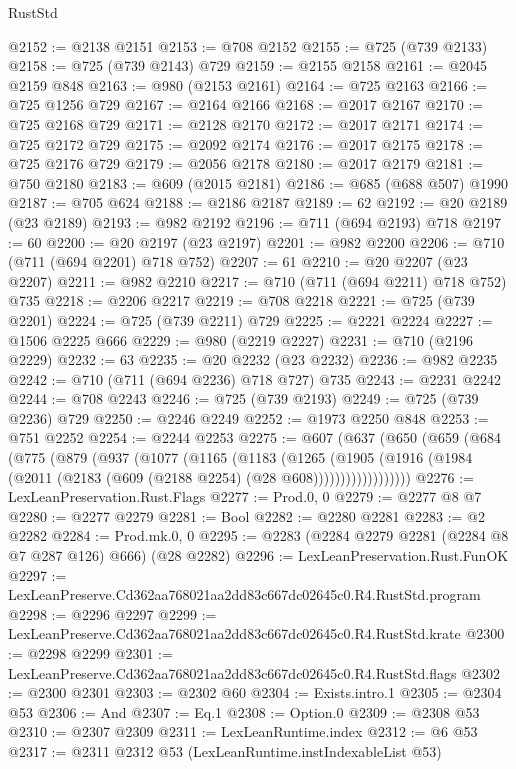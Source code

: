 \begin{lexlean}{RustStd}
\begin{coremodule}
@2152 := @2138 @2151
@2153 := @708 @2152
@2155 := @725 (@739 @2133)
@2158 := @725 (@739 @2143) @729
@2159 := @2155 @2158
@2161 := @2045 @2159 @848
@2163 := @980 (@2153 @2161)
@2164 := @725 @2163
@2166 := @725 @1256 @729
@2167 := @2164 @2166
@2168 := @2017 @2167
@2170 := @725 @2168 @729
@2171 := @2128 @2170
@2172 := @2017 @2171
@2174 := @725 @2172 @729
@2175 := @2092 @2174
@2176 := @2017 @2175
@2178 := @725 @2176 @729
@2179 := @2056 @2178
@2180 := @2017 @2179
@2181 := @750 @2180
@2183 := @609 (@2015 @2181)
@2186 := @685 (@688 @507) @1990
@2187 := @705 @624
@2188 := @2186 @2187
@2189 := 62
@2192 := @20 @2189 (@23 @2189)
@2193 := @982 @2192
@2196 := @711 (@694 @2193) @718
@2197 := 60
@2200 := @20 @2197 (@23 @2197)
@2201 := @982 @2200
@2206 := @710 (@711 (@694 @2201) @718 @752)
@2207 := 61
@2210 := @20 @2207 (@23 @2207)
@2211 := @982 @2210
@2217 := @710 (@711 (@694 @2211) @718 @752) @735
@2218 := @2206 @2217
@2219 := @708 @2218
@2221 := @725 (@739 @2201)
@2224 := @725 (@739 @2211) @729
@2225 := @2221 @2224
@2227 := @1506 @2225 @666
@2229 := @980 (@2219 @2227)
@2231 := @710 (@2196 @2229)
@2232 := 63
@2235 := @20 @2232 (@23 @2232)
@2236 := @982 @2235
@2242 := @710 (@711 (@694 @2236) @718 @727) @735
@2243 := @2231 @2242
@2244 := @708 @2243
@2246 := @725 (@739 @2193)
@2249 := @725 (@739 @2236) @729
@2250 := @2246 @2249
@2252 := @1973 @2250 @848
@2253 := @751 @2252
@2254 := @2244 @2253
@2275 := @607
    (@637
      (@650
        (@659
          (@684
            (@775
              (@879
                (@937
                  (@1077
                    (@1165
                      (@1183
                        (@1265
                          (@1905
                            (@1916
                              (@1984 (@2011 (@2183 (@609 (@2188 @2254) (@28 @608))))))))))))))))))
@2276 := LexLeanPreservation.Rust.Flags
@2277 := Prod.{0, 0}
@2279 := @2277 @8 @7
@2280 := @2277 @2279
@2281 := Bool
@2282 := @2280 @2281
@2283 := @2 @2282
@2284 := Prod.mk.{0, 0}
@2295 := @2283 (@2284 @2279 @2281 (@2284 @8 @7 @287 @126) @666) (@28 @2282)
@2296 := LexLeanPreservation.Rust.FunOK
@2297 := LexLeanPreserve.Cd362aa768021aa2dd83c667dc02645c0.R4.RustStd.program
@2298 := @2296 @2297
@2299 := LexLeanPreserve.Cd362aa768021aa2dd83c667dc02645c0.R4.RustStd.krate
@2300 := @2298 @2299
@2301 := LexLeanPreserve.Cd362aa768021aa2dd83c667dc02645c0.R4.RustStd.flags
@2302 := @2300 @2301
@2303 := @2302 @60
@2304 := Exists.intro.{1}
@2305 := @2304 @53
@2306 := And
@2307 := Eq.{1}
@2308 := Option.{0}
@2309 := @2308 @53
@2310 := @2307 @2309
@2311 := LexLeanRuntime.index
@2312 := @6 @53
@2317 := @2311 @2312 @53 (LexLeanRuntime.instIndexableList @53)

\end{coremodule}
\end{lexlean}
